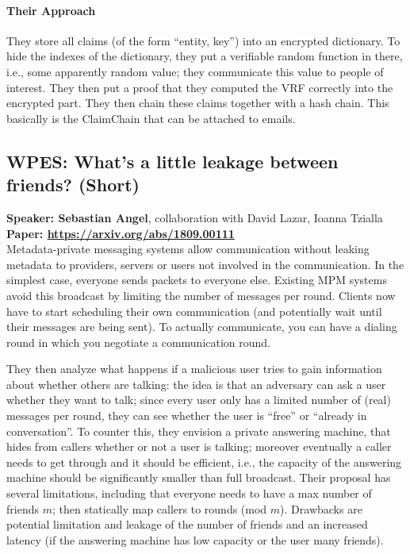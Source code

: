 \documentclass{article}
\begin{document}
\paragraph{Their Approach}
They store all claims (of the form ``entity, key'') into an encrypted dictionary. To hide the indexes of the dictionary, they put a verifiable random function in there, i.e., some apparently random value; they communicate this value to people of interest. They then put a proof that they computed the VRF correctly into the encrypted part. They then chain these claims together with a hash chain. This basically is the ClaimChain that can be attached to emails.


\subsection{WPES: What's a little leakage between friends? (Short)}
\noindent\textbf{Speaker: Sebastian Angel}, collaboration with David Lazar, Ioanna Tzialla\\
\noindent\textbf{Paper: \url{https://arxiv.org/abs/1809.00111}}\\

Metadata-private messaging systems allow communication without leaking metadata to providers, servers or users not involved in the communication. In the simplest case, everyone sends packets to everyone else. Existing MPM systems avoid this broadcast by limiting the number of messages per round. Clients now have to start scheduling their own communication (and potentially wait until their messages are being sent). To actually communicate, you can have a dialing round in which you negotiate a communication round.

They then analyze what happens if a malicious user tries to gain information about whether others are talking: the idea is that an adversary can ask a user whether they want to talk; since every user only has a limited number of (real) messages per round, they can see whether the user is ``free'' or ``already in conversation''. To counter this, they envision a private answering machine, that hides from callers whether or not a user is talking; moreover eventually a caller needs to get through and it should be efficient, i.e., the capacity of the answering machine should be significantly smaller than full broadcast. Their proposal has several limitations, including that everyone needs to have a max number of friends $m$; then statically map callers to rounds (mod $m$). Drawbacks are potential limitation and leakage of the number of friends and an increased latency (if the answering machine has low capacity or the user many friends).
\end{document}
